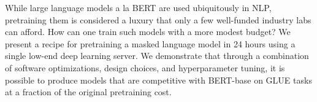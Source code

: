 While large language models a la BERT are used ubiquitously in NLP, pretraining them is considered a luxury that only a few well-funded industry labs can afford. How can one train such models with a more modest budget? We present a recipe for pretraining a masked language model in 24 hours using a single low-end deep learning server. We demonstrate that through a combination of software optimizations, design choices, and hyperparameter tuning, it is possible to produce models that are competitive with BERT-base on GLUE tasks at a fraction of the original pretraining cost.
